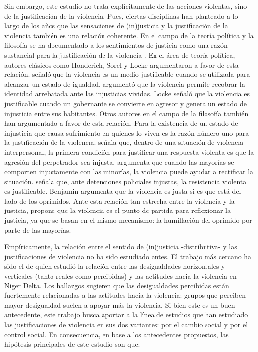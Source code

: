 \documentclass[12pt,twoside]{templates/facsothesis}
\begin{document}
Sin embargo, este estudio no trata explícitamente de las acciones violentas, sino de la justificación de la violencia. Pues, ciertas disciplinas han planteado a lo largo de los años que las sensaciones de (in)justicia y la justificación de la violencia también es una relación coherente. En el campo de la teoría política y la filosofía se ha documentado a los sentimientos de justicia como una razón sustancial para la justificación de la violencia \citep[i.e.][]{Runkle1976, Dean2005, Magil2008, Galtung1969, Nielsen1981, Bufacchi2007, Wells1970, Stateva2009, Frazer2019}. En el área de teoría política, autores clásicos como Honderich, Sorel y Locke argumentaron a favor de esta relación. \citet{Honderich2014} señaló que la violencia es un medio justificable cuando se utilizada para alcanzar un estado de igualdad. \citet{Sorel1999} argumentó que la violencia permite recobrar la identidad arrebatada ante las injusticias vividas. Locke \citep[en][]{Frazer2020} señaló que la violencia es justificable cuando un gobernante se convierte en agresor y genera un estado de injusticia entre sus habitantes. Otros autores en el campo de la filosofía también han argumentado a favor de esta relación. Para \citet{Wells1970} la existencia de un estado de injusticia que causa sufrimiento en quienes lo viven es la razón número uno para la justificación de la violencia. \citet{Reitan2002} señala que, dentro de una situación de violencia interpersonal, la primera condición para justificar una respuesta violenta es que la agresión del perpetrador sea injusta. \citet{Magil2008} argumenta que cuando las mayorías se comporten injustamente con las minorías, la violencia puede ayudar a rectificar la situación. \citet{Nielsen1981} señala que, ante detenciones policiales injustas, la resistencia violenta es justificable. Benjamin \citep[en][]{Stateva2009} argumenta que la violencia es justa si es que está del lado de los oprimidos. Ante esta relación tan estrecha entre la violencia y la justicia, \citet{Bufacchi2007} propone que la violencia es el punto de partida para reflexionar la justicia, ya que se basan en el mismo mecanismo: la humillación del oprimido por parte de las mayorías.

Empíricamente, la relación entre el sentido de (in)justicia -distributiva- y las justificaciones de violencia no ha sido estudiado antes. El trabajo más cercano ha sido el de \citet{Rustad2016} quien estudió la relación entre las desigualdades horizontales y verticales (tanto reales como percibidas) y las actitudes hacia la violencia en Niger Delta. Los hallazgos sugieren que las desigualdades percibidas están fuertemente relacionadas a las actitudes hacia la violencia: grupos que perciben mayor desigualdad suelen a apoyar más la violencia. Si bien este es un buen antecedente, este trabajo busca aportar a la línea de estudios que han estudiado las justificaciones de violencia en sus dos variantes: por el cambio social y por el control social. En consecuencia, en base a los antecedentes propuestos, las hipótesis principales de este estudio son que:
\end{document}
